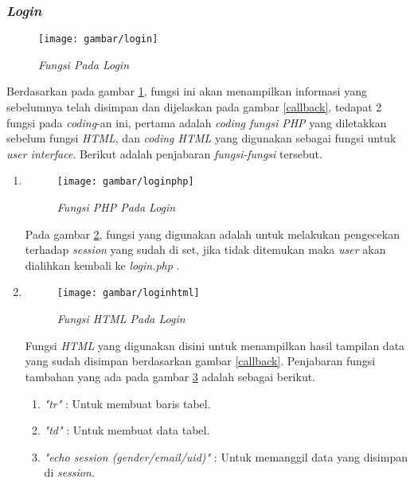 \subsubsection{\textit{Login}}
\begin{figure}[!htbp]
    \centering
    \texttt{[image: gambar/login]}
    \caption{\textit{Fungsi Pada Login}}
    \label{login}
\end{figure}
\par 
Berdasarkan pada gambar \ref{login}, fungsi ini akan menampilkan informasi yang sebelumnya telah disimpan dan dijelaskan pada gambar \ref{callback}. tedapat 2 fungsi pada \textit{coding}-an ini, pertama adalah \textit{coding fungsi PHP} yang diletakkan sebelum fungsi \textit{HTML}, dan \textit{coding HTML} yang digunakan sebagai fungsi untuk \textit{user interface}. Berikut adalah penjabaran \textit{fungsi-fungsi} tersebut.
\begin{enumerate}
\item 
\begin{figure}[!htbp]
    \centering
    \texttt{[image: gambar/loginphp]}
    \caption{\textit{Fungsi \textit{PHP} Pada \textit{Login}}}
    \label{loginphp}
\end{figure}
\par 
Pada gambar \ref{loginphp}, fungsi yang digunakan adalah untuk melakukan pengecekan terhadap \textit{session} yang sudah di set, jika tidak ditemukan maka \textit{user} akan dialihkan kembali ke \textit{login.php} .

\item
\begin{figure}[!htbp]
    \centering
    \texttt{[image: gambar/loginhtml]}
    \caption{\textit{Fungsi \textit{HTML} Pada \textit{Login}}}
    \label{loginhtml}
\end{figure}
\par 
Fungsi \textit{HTML} yang digunakan disini untuk menampilkan hasil tampilan data yang sudah disimpan berdasarkan gambar \ref{callback}. Penjabaran fungsi tambahan yang ada pada gambar \ref{loginhtml} adalah sebagai berikut.
\\
\begin{enumerate}
\item \textit{"tr"} : Untuk membuat baris tabel.
\item \textit{"td"} : Untuk membuat data tabel.
\item \textit{"echo session (gender/email/uid)"} : Untuk memanggil data yang disimpan di \textit{session}.
\end{enumerate}
\end{enumerate}


